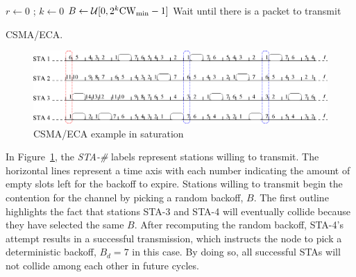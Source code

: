 \documentclass[a4paper,journal]{IEEEtran}
\begin{document}
\begin{algorithm}[ht!!!]
{
  $r \leftarrow 0$ ; $k \leftarrow 0$\;
  $B \leftarrow \mathcal{U}[0,2^k{\rm{CW}_{min}}-1]$\;
  Wait until there is a packet to transmit\;
}
\caption{\small{CSMA/ECA.}}
\label{alg:CSMA_ECA}
\end{algorithm}


\begin{figure}[tb]
\centering
  \includegraphics[width=0.8\linewidth]{figures/basicECA.eps}
  \caption{CSMA/ECA example in saturation}
  \label{fig:BECA-example}
\end{figure}

In Figure~\ref{fig:BECA-example}, the \emph{STA-\#} labels represent stations willing to transmit. The horizontal lines represent a time axis with each number indicating the amount of empty slots left for the backoff to expire. Stations willing to transmit begin the contention for the channel by picking a random backoff, $B$. The first outline highlights the fact that stations STA-3 and STA-4 will eventually collide because they have selected the same $B$. After recomputing the random backoff, STA-4's attempt results in a successful transmission, which instructs the node to pick a deterministic backoff, $B_{d}=7$ in this case. By doing so, all successful STAs will not collide among each other in future cycles.
\end{document}
